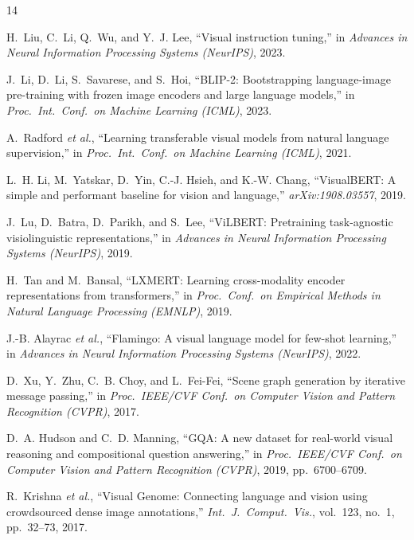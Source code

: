 \documentclass[10pt,twocolumn]{article}
\begin{document}
\begin{thebibliography}{14}

H.~Liu, C.~Li, Q.~Wu, and Y.~J. Lee,
``Visual instruction tuning,''
in \textit{Advances in Neural Information Processing Systems (NeurIPS)}, 2023.

J.~Li, D.~Li, S.~Savarese, and S.~Hoi,
``BLIP-2: Bootstrapping language-image pre-training with frozen image encoders and large language models,''
in \textit{Proc.\ Int.\ Conf.\ on Machine Learning (ICML)}, 2023.

A.~Radford \textit{et al.},
``Learning transferable visual models from natural language supervision,''
in \textit{Proc.\ Int.\ Conf.\ on Machine Learning (ICML)}, 2021.

L.~H. Li, M.~Yatskar, D.~Yin, C.-J. Hsieh, and K.-W. Chang,
``VisualBERT: A simple and performant baseline for vision and language,''
\textit{arXiv:1908.03557}, 2019.

J.~Lu, D.~Batra, D.~Parikh, and S.~Lee,
``ViLBERT: Pretraining task-agnostic visiolinguistic representations,''
in \textit{Advances in Neural Information Processing Systems (NeurIPS)}, 2019.

H.~Tan and M.~Bansal,
``LXMERT: Learning cross-modality encoder representations from transformers,''
in \textit{Proc.\ Conf.\ on Empirical Methods in Natural Language Processing (EMNLP)}, 2019.

J.-B. Alayrac \textit{et al.},
``Flamingo: A visual language model for few-shot learning,''
in \textit{Advances in Neural Information Processing Systems (NeurIPS)}, 2022.

D.~Xu, Y.~Zhu, C.~B. Choy, and L.~Fei-Fei,
``Scene graph generation by iterative message passing,''
in \textit{Proc.\ IEEE/CVF Conf.\ on Computer Vision and Pattern Recognition (CVPR)}, 2017.

D.~A. Hudson and C.~D. Manning,
``GQA: A new dataset for real-world visual reasoning and compositional question answering,''
in \textit{Proc.\ IEEE/CVF Conf.\ on Computer Vision and Pattern Recognition (CVPR)}, 2019, pp.~6700--6709.

R.~Krishna \textit{et al.},
``Visual Genome: Connecting language and vision using crowdsourced dense image annotations,''
\textit{Int.\ J.\ Comput.\ Vis.}, vol.~123, no.~1, pp.~32--73, 2017.


\end{thebibliography}
\end{document}
